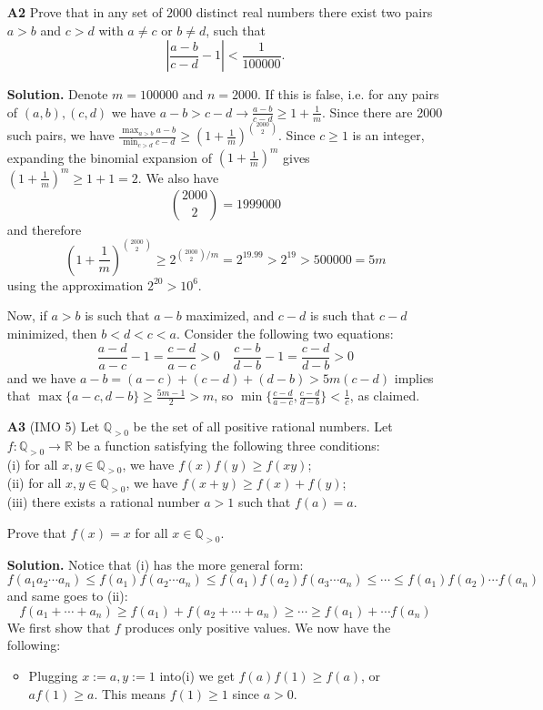 \documentclass[11pt,a4paper]{article}
\begin{document}
\begin{enumerate}
	\item [\textbf{A2}] Prove that in any set of $2000$ distinct real numbers there exist two pairs $a>b$ and $c>d$ with $a \neq c$ or $b \neq d $, such that \[ \left| \frac{a-b}{c-d} - 1 \right|< \frac{1}{100000}. \]
	
	\textbf{Solution.} 
	Denote $m=100000$ and $n=2000$.  
	If this is false, i.e. for any pairs of $(a, b), (c, d)$ we have $a-b>c-d\to \frac{a-b}{c-d} \ge 1+\frac {1}{m}$. 
	Since there are 2000 such pairs, we have $\frac{\max_{a>b} a-b}{\min_{c>d} c - d}\ge (1+\frac{1}{m})^{\binom{2000}{2}}$. 
	Since $c\ge 1$ is an integer, expanding the binomial expansion of $(1+\frac{1}{m})^m$ gives $(1+\frac{1}{m})^m\ge 1+1=2$. We also have 
	\[
	\binom{2000}{2}=1999000
	\]
	and therefore 
	\[(1+\frac{1}{m})^{\binom{2000}{2}}\ge 2^{\binom{2000}{2}/m}
	=2^{19.99}>2^{19}>500000=5m\]
	using the approximation $2^{20}>10^6$. 
	
	Now, if $a>b$ is such that $a-b$ maximized, and $c-d$ is such that $c-d$ minimized, then $b<d<c<a$. 
	Consider the following two equations: 
	\[
	\frac{a-d}{a-c}-1=\frac{c-d}{a-c}>0\quad \frac{c-b}{d-b}-1 = \frac{c-d}{d-b}>0
	\]
	and we have $a-b=(a-c)+(c-d)+(d-b)>5m(c-d)$ implies that $\max\{a-c, d-b\}\ge\frac{5m-1}{2}>m$, so $\min \{\frac{c-d}{a-c}, \frac{c-d}{d-b}\}<\frac{1}{c}$, as claimed. 
	
	\item [\textbf{A3}] (IMO 5)
	Let $\mathbb Q_{>0}$ be the set of all positive rational numbers. Let $f:\mathbb Q_{>0}\to\mathbb R$ be a function satisfying the following three conditions:\\
	(i) for all $x,y\in\mathbb Q_{>0}$, we have $f(x)f(y)\geq f(xy)$;\\
	(ii) for all $x,y\in\mathbb Q_{>0}$, we have $f(x+y)\geq f(x)+f(y)$;\\
	(iii) there exists a rational number $a>1$ such that $f(a)=a$.
	
	Prove that $f(x)=x$ for all $x\in\mathbb Q_{>0}$.
	
	\textbf{Solution.} 
	Notice that (i) has the more general form: 
	\[
	f(a_1a_2\cdots a_n)
	\le f(a_1)f(a_2\cdots a_n)
	\le f(a_1)f(a_2)f(a_3\cdots a_n)
	\le\cdots
	\le f(a_1)f(a_2)\cdots f(a_n)
	\]
	and same goes to (ii):
	\[
	f(a_1+\cdots + a_n)
	\ge f(a_1)+f(a_2+\cdots + a_n)
	\ge
	\cdots
	\ge f(a_1)+\cdots f(a_n)
	\]
	We first show that $f$ produces only positive values. We now have the following:
	\begin{itemize}
		\item Plugging $x:=a, y:=1$ into(i) we get $f(a)f(1)\ge f(a)$, or $af(1)\ge a$. This means $f(1)\ge 1$ since $a>0$. 
		

\end{itemize}
\end{enumerate}
\end{document}
